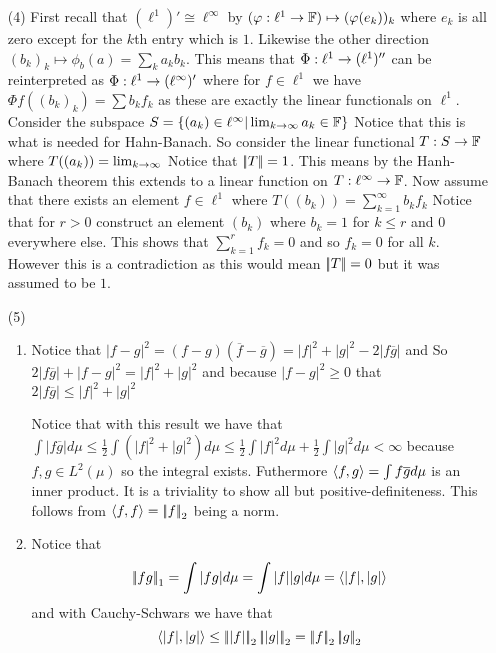 \documentclass[12pt]{amsart}
\begin{document}
\begin{itemize}
   \item[(4)] First recall that $(\ell^1)'\cong \ell^\infty$ by 
   $(\varphi:\ell^1\rightarrow \mathbb{F})\mapsto(\varphi(e_k))_k$ where $e_k$ is all zero except for the $k$th entry which is $1$.
   Likewise the other direction $(b_k)_k\mapsto \phi_b(a)=\sum_ka_kb_k$. This means that $\Phi:\ell^1\rightarrow (\ell^1)''$ 
   can be reinterpreted as $\Phi:\ell^1\rightarrow (\ell^\infty)'$ where for $f\in\ell^1$ we have $\Phi f ((b_k)_k)=\sum b_k f_k$ as these are exactly the linear functionals on $\ell^1$.
   Consider the subspace $S=\{(a_k)\in\ell^\infty| \lim_{k\rightarrow\infty}a_k\in\mathbb{F}\}$ 
   Notice that this is what is needed for Hahn-Banach. So consider the linear functional
   $T:S\rightarrow\mathbb{F}$ where $T((a_k))=\lim_{k\rightarrow \infty}$ Notice that $\norm{T}=1$. This means
   by the Hanh-Banach theorem this extends to a linear function on $T:\ell^\infty\rightarrow \mathbb{F}$.
   Now assume that there exists an element $f\in\ell^1$ where $T((b_k))=\sum_{k=1}^\infty b_kf_k$
   Notice that for $r>0$ construct an element $(b_k)$ where $b_k=1$ for $k\leq r$ and $0$ everywhere else.
   This shows that $\sum_{k=1}^r f_k = 0$ and so $f_k=0$ for all $k$. However this is a contradiction as this would mean $\norm{T}=0$ but it was assumed to be $1$.
   \item[(5)] 
      \begin{enumerate}
         \item Notice that $|f-g|^2=(f-g)(\overline{f}-\overline{g})=|f|^2+|g|^2-2|f\overline{g}|$ and So
              $2|f\overline{g}|+|f-g|^2=|f|^2+|g|^2$ and because $|f-g|^2\geq 0$ that
              $2|f\overline{g}|\leq|f|^2+|g|^2$
         
         
         Notice that with this result we have that $\int|f\overline{g}|d\mu\leq\frac{1}{2}\int(|f|^2+|g|^2)d\mu \leq \frac{1}{2}\int|f|^2d\mu +\frac{1}{2}\int|g|^2d\mu <\infty$ 
         because $f,g\in L^2(\mu)$ so the integral exists. Futhermore $\left\langle f,g \right\rangle=\int f\overline{g} d\mu$ is an inner product. It is a triviality to show all but positive-definiteness.
         This follows from $\ip{f,f}=\norm{f}_2$ being a norm.

         \item Notice that 
         \[\norm{fg}_1=\int|fg|d\mu =\int |f||g|d\mu = \ip{|f|,|g|}\]
         and with Cauchy-Schwars we have that
         \[\ip{|f|,|g|}\leq \norm{|f|}_2\norm{|g|}_2=\norm{f}_2\norm{g}_2\]
      \end{enumerate}
\end{itemize}
\end{document}
